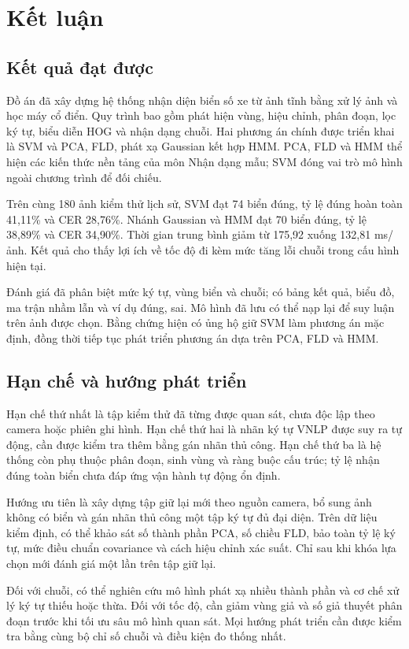 \chapter{Kết luận}
\section{Kết quả đạt được}
Đồ án đã xây dựng hệ thống nhận diện biển số xe từ ảnh tĩnh bằng xử lý ảnh và học máy cổ điển. Quy trình bao gồm phát hiện vùng, hiệu chỉnh, phân đoạn, lọc ký tự, biểu diễn HOG và nhận dạng chuỗi. Hai phương án chính được triển khai là SVM và PCA, FLD, phát xạ Gaussian kết hợp HMM. PCA, FLD và HMM thể hiện các kiến thức nền tảng của môn Nhận dạng mẫu; SVM đóng vai trò mô hình ngoài chương trình để đối chiếu.

Trên cùng 180 ảnh kiểm thử lịch sử, SVM đạt 74 biển đúng, tỷ lệ đúng hoàn toàn 41,11\% và CER 28,76\%. Nhánh Gaussian và HMM đạt 70 biển đúng, tỷ lệ 38,89\% và CER 34,90\%. Thời gian trung bình giảm từ 175,92 xuống 132,81 ms/ảnh. Kết quả cho thấy lợi ích về tốc độ đi kèm mức tăng lỗi chuỗi trong cấu hình hiện tại.

Đánh giá đã phân biệt mức ký tự, vùng biển và chuỗi; có bảng kết quả, biểu đồ, ma trận nhầm lẫn và ví dụ đúng, sai. Mô hình đã lưu có thể nạp lại để suy luận trên ảnh được chọn. Bằng chứng hiện có ủng hộ giữ SVM làm phương án mặc định, đồng thời tiếp tục phát triển phương án dựa trên PCA, FLD và HMM.

\section{Hạn chế và hướng phát triển}
Hạn chế thứ nhất là tập kiểm thử đã từng được quan sát, chưa độc lập theo camera hoặc phiên ghi hình. Hạn chế thứ hai là nhãn ký tự VNLP được suy ra tự động, cần được kiểm tra thêm bằng gán nhãn thủ công. Hạn chế thứ ba là hệ thống còn phụ thuộc phân đoạn, sinh vùng và ràng buộc cấu trúc; tỷ lệ nhận đúng toàn biển chưa đáp ứng vận hành tự động ổn định.

Hướng ưu tiên là xây dựng tập giữ lại mới theo nguồn camera, bổ sung ảnh không có biển và gán nhãn thủ công một tập ký tự đủ đại diện. Trên dữ liệu kiểm định, có thể khảo sát số thành phần PCA, số chiều FLD, bảo toàn tỷ lệ ký tự, mức điều chuẩn covariance và cách hiệu chỉnh xác suất. Chỉ sau khi khóa lựa chọn mới đánh giá một lần trên tập giữ lại.

Đối với chuỗi, có thể nghiên cứu mô hình phát xạ nhiều thành phần và cơ chế xử lý ký tự thiếu hoặc thừa. Đối với tốc độ, cần giảm vùng giả và số giả thuyết phân đoạn trước khi tối ưu sâu mô hình quan sát. Mọi hướng phát triển cần được kiểm tra bằng cùng bộ chỉ số chuỗi và điều kiện đo thống nhất.
